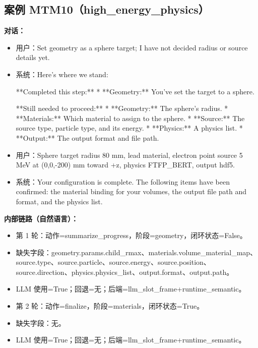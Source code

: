 \documentclass[11pt]{ctexart}
\begin{document}
\subsection{案例 MTM10（high\_energy\_physics）}
\textbf{对话：}
\begin{itemize}
\item 用户：Set geometry as a sphere target; I have not decided radius or source details yet.
\item 系统：Here's where we stand:

**Completed this step:**
*   **Geometry:** You've set the target to a sphere.

**Still needed to proceed:**
*   **Geometry:** The sphere's radius.
*   **Materials:** Which material to assign to the sphere.
*   **Source:** The source type, particle type, and its energy.
*   **Physics:** A physics list.
*   **Output:** The output format and file path.
\item 用户：Sphere target radius 80 mm, lead material, electron point source 5 MeV at (0,0,-200) mm toward +z, physics FTFP\_BERT, output hdf5.
\item 系统：Your configuration is complete. The following items have been confirmed: the material binding for your volumes, the output file path and format, and the physics list.
\end{itemize}
\textbf{内部链路（自然语言）：}
\begin{itemize}
\item 第 1 轮：动作=summarize\_progress，阶段=geometry，闭环状态=False。
\item 缺失字段：geometry.params.child\_rmax、materials.volume\_material\_map、source.type、source.particle、source.energy、source.position、source.direction、physics.physics\_list、output.format、output.path。
\item LLM 使用=True；回退=无；后端=llm\_slot\_frame+runtime\_semantic。
\item 第 2 轮：动作=finalize，阶段=materials，闭环状态=True。
\item 缺失字段：无。
\item LLM 使用=True；回退=无；后端=llm\_slot\_frame+runtime\_semantic。
\end{itemize}
\end{document}
